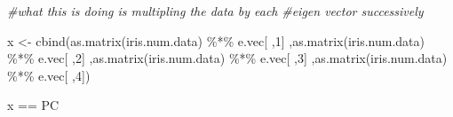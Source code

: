 \documentclass[
]{book}
\newenvironment{Shaded}{\begin{snugshade}}{\end{snugshade}}
\newcommand{\CommentTok}[1]{\textcolor[rgb]{0.56,0.35,0.01}{\textit{#1}}}
\newcommand{\DecValTok}[1]{\textcolor[rgb]{0.00,0.00,0.81}{#1}}
\newcommand{\FunctionTok}[1]{\textcolor[rgb]{0.00,0.00,0.00}{#1}}
\newcommand{\NormalTok}[1]{#1}
\newcommand{\OtherTok}[1]{\textcolor[rgb]{0.56,0.35,0.01}{#1}}
\newcommand{\SpecialCharTok}[1]{\textcolor[rgb]{0.00,0.00,0.00}{#1}}
\begin{document}
\begin{Shaded}
\begin{Highlighting}[]
\CommentTok{\#what this is doing is multipling the data by each}
\CommentTok{\#eigen vector successively}

\NormalTok{x }\OtherTok{\textless{}{-}} \FunctionTok{cbind}\NormalTok{(}\FunctionTok{as.matrix}\NormalTok{(iris.num.data) }\SpecialCharTok{\%*\%}\NormalTok{ e.vec[ ,}\DecValTok{1}\NormalTok{]}
\NormalTok{,}\FunctionTok{as.matrix}\NormalTok{(iris.num.data) }\SpecialCharTok{\%*\%}\NormalTok{ e.vec[ ,}\DecValTok{2}\NormalTok{]}
\NormalTok{,}\FunctionTok{as.matrix}\NormalTok{(iris.num.data) }\SpecialCharTok{\%*\%}\NormalTok{ e.vec[ ,}\DecValTok{3}\NormalTok{]}
\NormalTok{,}\FunctionTok{as.matrix}\NormalTok{(iris.num.data) }\SpecialCharTok{\%*\%}\NormalTok{ e.vec[ ,}\DecValTok{4}\NormalTok{])}

\NormalTok{x }\SpecialCharTok{==}\NormalTok{ PC}
\end{Highlighting}
\end{Shaded}
\end{document}
